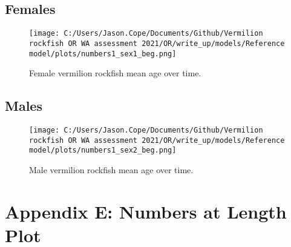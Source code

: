 \documentclass[11pt,
  english,
  a4paper,
]{article}
\begin{document}
\leavevmode\tagmcend\tagstructend


\hypertarget{females}{%
\subsection{Females}\label{females}}

\leavevmode\tagmcend\tagstructend


\begin{figure}
\centering
\texttt{[image: C:/Users/Jason.Cope/Documents/Github/Vermilion rockfish OR WA assessment 2021/OR/write\_up/models/Reference model/plots/numbers1\_sex1\_beg.png]}
\caption{Female vermilion rockfish mean age over time.\label{fig:num_age_females}}
\end{figure}

\tagmcend\tagstructend


\hypertarget{males}{%
\subsection{Males}\label{males}}

\leavevmode\tagmcend\tagstructend


\begin{figure}
\centering
\texttt{[image: C:/Users/Jason.Cope/Documents/Github/Vermilion rockfish OR WA assessment 2021/OR/write\_up/models/Reference model/plots/numbers1\_sex2\_beg.png]}
\caption{Male vermilion rockfish mean age over time.\label{fig:num_age_males}}
\end{figure}

\tagmcend\tagstructend

\clearpage


\hypertarget{app-e}{%
\section{Appendix E: Numbers at Length Plot}\label{app-e}}
\end{document}
